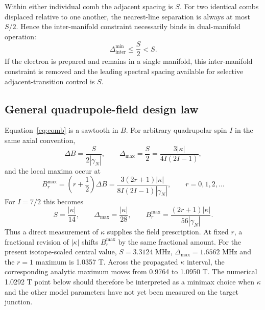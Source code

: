 \documentclass[11pt]{article}
\newcommand{\DeltaInter}{\Delta_{\mathrm{inter}}^{\min}}
\begin{document}
Within either individual comb the adjacent spacing is $S$. For two identical combs displaced relative to one another, the nearest-line separation is always at most $S/2$. Hence the inter-manifold constraint necessarily binds in dual-manifold operation:
\begin{equation}
\DeltaInter\leq\frac{S}{2}<S.
\label{eq:binding}
\end{equation}
If the electron is prepared and remains in a single manifold, this inter-manifold constraint is removed and the leading spectral spacing available for selective adjacent-transition control is $S$.

\subsection{General quadrupole-field design law}
Equation~\eqref{eq:comb} is a sawtooth in $B$. For arbitrary quadrupolar spin $I$ in the same axial convention,
\begin{equation}
\Delta B=\frac{S}{2|\gamma_N|},\qquad
\Delta_{\max}=\frac{S}{2}=\frac{3|\kappa|}{4I(2I-1)},
\label{eq:generalceiling}
\end{equation}
and the local maxima occur at
\begin{equation}
B_r^{\max}=\left(r+\frac{1}{2}\right)\Delta B
=\frac{3(2r+1)|\kappa|}{8I(2I-1)|\gamma_N|},\qquad r=0,1,2,\ldots
\label{eq:Bgeneral}
\end{equation}
For $I=7/2$ this becomes
\begin{equation}
S=\frac{|\kappa|}{14},\qquad
\Delta_{\max}=\frac{|\kappa|}{28},\qquad
B_r^{\max}=\frac{(2r+1)|\kappa|}{56|\gamma_N|}.
\label{eq:TiRule}
\end{equation}
Thus a direct measurement of $\kappa$ supplies the field prescription. At fixed $r$, a fractional revision of $|\kappa|$ shifts $B_r^{\max}$ by the same fractional amount. For the present isotope-scaled central value, $S=3.3124$ MHz, $\Delta_{\max}=1.6562$ MHz and the $r=1$ maximum is 1.0357 T. Across the propagated $\kappa$ interval, the corresponding analytic maximum moves from 0.9764 to 1.0950 T. The numerical 1.0292 T point below should therefore be interpreted as a minimax choice when $\kappa$ and the other model parameters have not yet been measured on the target junction.
\end{document}
